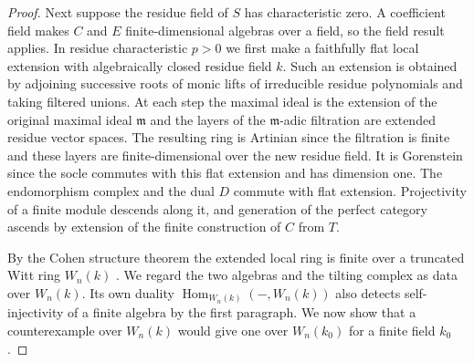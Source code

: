 \documentclass[12pt,a4paper,english,reqno]{amsart}
\numberwithin{equation}{section}
\theoremstyle{plain}
\theoremstyle{definition}
\begin{document}
\begin{proof}
Next suppose the residue field of $S$ has characteristic zero.
A coefficient field makes $C$ and $E$ finite-dimensional
algebras over a field, so the field result applies. In residue
characteristic $p>0$ we first make a faithfully flat local
extension with algebraically closed residue field $k$. Such an
extension is obtained by adjoining successive roots of monic lifts
of irreducible residue polynomials and taking filtered unions.
At each step the maximal ideal is the extension of the original
maximal ideal $\mathfrak m$ and the layers of the
$\mathfrak m$-adic filtration are extended residue vector spaces.
The resulting ring is Artinian since the filtration is finite
and these layers are finite-dimensional over the new residue
field. It is Gorenstein since the socle commutes with this flat
extension and has dimension one. The endomorphism complex and
the dual $D$ commute with flat extension. Projectivity of a finite
module descends along it, and generation of the perfect category
ascends by extension of the finite construction of $C$ from $T$.

By the Cohen structure theorem the extended local ring is finite
over a truncated Witt ring $W_n(k)$
\cite{StacksCohen,SerreLocalFields}. We regard the two algebras
and the tilting complex as data over $W_n(k)$. Its own duality
$\operatorname{Hom}_{W_n(k)}(-,W_n(k))$ also detects
self-injectivity of a finite algebra by the first paragraph.
We now show that a counterexample over $W_n(k)$ would give one
over $W_n(k_0)$ for a finite field $k_0$.


\end{proof}
\end{document}
